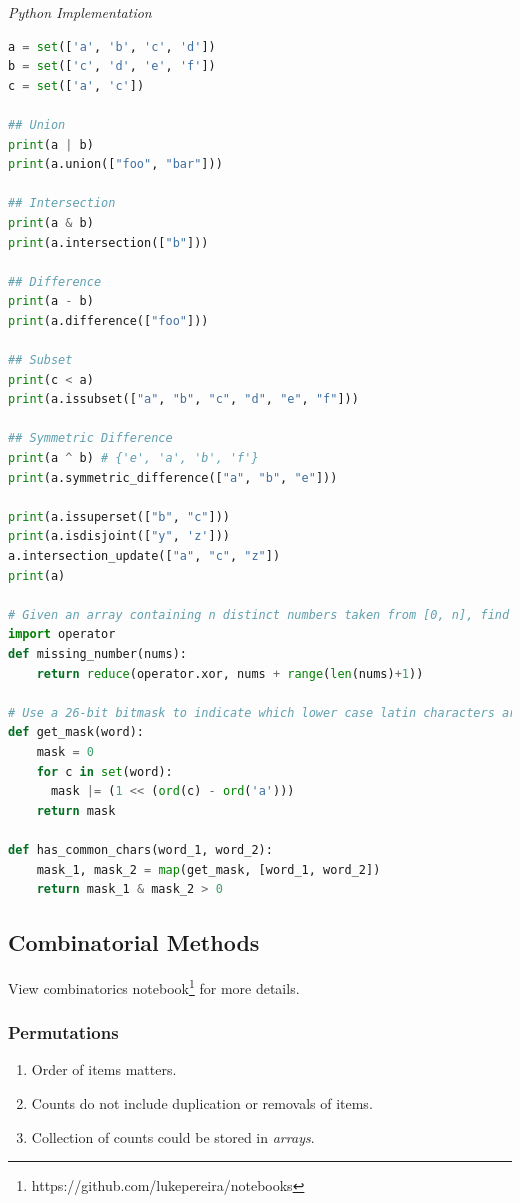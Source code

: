 \documentclass{article}
\begin{document}
    

\vspace{8pt} \emph{Python Implementation}
\begin{lstlisting}[language=Python]
a = set(['a', 'b', 'c', 'd'])
b = set(['c', 'd', 'e', 'f'])
c = set(['a', 'c'])

## Union
print(a | b)
print(a.union(["foo", "bar"]))

## Intersection 
print(a & b)
print(a.intersection(["b"]))

## Difference 
print(a - b)
print(a.difference(["foo"]))

## Subset
print(c < a)
print(a.issubset(["a", "b", "c", "d", "e", "f"]))

## Symmetric Difference
print(a ^ b) # {'e', 'a', 'b', 'f'}
print(a.symmetric_difference(["a", "b", "e"]))

print(a.issuperset(["b", "c"]))
print(a.isdisjoint(["y", 'z']))
a.intersection_update(["a", "c", "z"])
print(a)

# Given an array containing n distinct numbers taken from [0, n], find the one that is missing from the array.
import operator
def missing_number(nums):
    return reduce(operator.xor, nums + range(len(nums)+1))

# Use a 26-bit bitmask to indicate which lower case latin characters are inside the string.
def get_mask(word):
    mask = 0
    for c in set(word):
      mask |= (1 << (ord(c) - ord('a')))
    return mask
    
def has_common_chars(word_1, word_2):
    mask_1, mask_2 = map(get_mask, [word_1, word_2])
    return mask_1 & mask_2 > 0
\end{lstlisting}    

\subsection{Combinatorial Methods}

    View combinatorics notebook\footnote{https://github.com/lukepereira/notebooks} for more details.

    \subsubsection{Permutations}
    \begin{enumerate}
        \item Order of items matters.
        \item Counts do not include duplication or removals of items.
        \item Collection of counts could be stored in \emph{arrays}. 
    \end{enumerate} 
    
\end{document}
